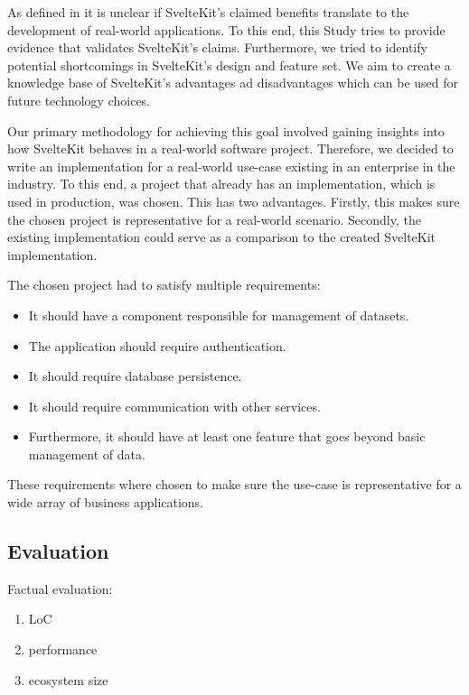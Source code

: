 



As defined in  it is unclear if SvelteKit's claimed benefits translate to the development of real-world applications. To this end, this Study tries to provide evidence that validates SvelteKit's claims. Furthermore, we tried to identify potential shortcomings in SvelteKit's design and feature set. We aim to create a knowledge base of SvelteKit's advantages ad disadvantages which can be used for future technology  choices.

Our primary methodology for achieving this goal involved gaining insights into how SvelteKit behaves in a real-world software project. Therefore, we decided to write an implementation for a real-world use-case existing in an enterprise in the industry. To this end, a project that already has an implementation, which is used in production, was chosen. This has two advantages. Firstly, this makes sure the chosen project is representative for a real-world scenario. Secondly, the existing implementation could serve as a comparison to the created SvelteKit implementation.

The chosen project had to satisfy multiple requirements:
\begin{itemize}
    \item It should have a component responsible for management of datasets.
    \item The application should require authentication.
    \item It should require database persistence.
    \item It should require communication with other services.  
    \item Furthermore, it should have at least one feature that goes beyond basic management of data.
\end{itemize}
These requirements where chosen to make sure the use-case is representative for a wide array of business applications. 

\subsection{Evaluation}

Factual evaluation:
\begin{enumerate}
    \item LoC
    \item performance
    \item ecosystem size
\end{enumerate}